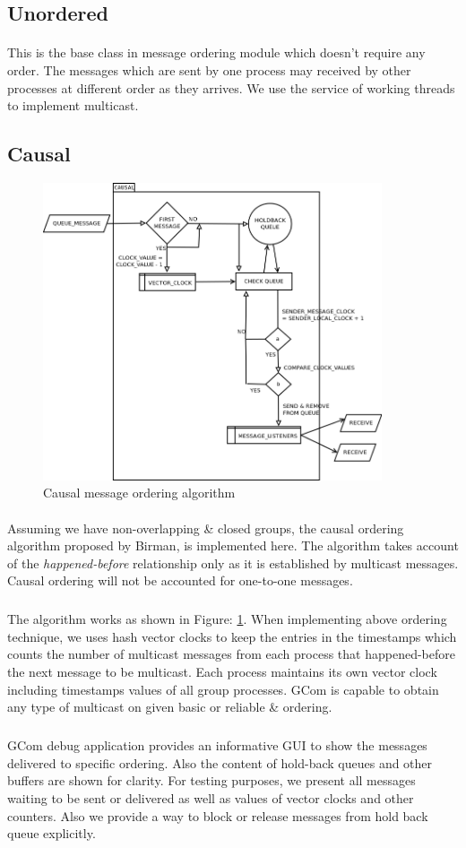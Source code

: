 \documentclass[a4paper,english,twoside]{article}
\begin{document}
\subsection{Unordered}
\paragraph{}
This is the base class in message ordering module which doesn't require any order. The messages which are sent by one process may received by other processes at different order as they arrives. We use the service of working threads to implement multicast.

\subsection{Causal}
\begin{figure}[h]
\centering \includegraphics[width=10cm]{causal.png}
\caption{Causal message ordering algorithm}
\label{fig:causal}
\end{figure}
\paragraph{}
Assuming we have non-overlapping \& closed groups, the causal ordering algorithm proposed by Birman, is implemented here. The algorithm takes account of the \emph{happened-before} relationship only as it is established by multicast messages. Causal ordering will not be accounted for one-to-one messages.
\subparagraph{}
The algorithm works as shown in Figure: \ref{fig:causal}. When implementing above ordering technique, we uses hash vector clocks to keep the entries in the timestamps which counts the number of multicast messages from each process that happened-before the next message to be multicast. Each process maintains its own vector clock including timestamps values of all group processes. GCom is capable to obtain any type of multicast on given basic or reliable \& ordering.
\subparagraph{}
GCom debug application provides an informative GUI to show the messages delivered to specific ordering. Also the content of hold-back queues and other buffers are shown for clarity. For testing purposes, we present all messages waiting to be
sent or delivered as well as values of vector clocks and other counters. Also we provide a way to block or release messages from hold back queue explicitly.
\end{document}
